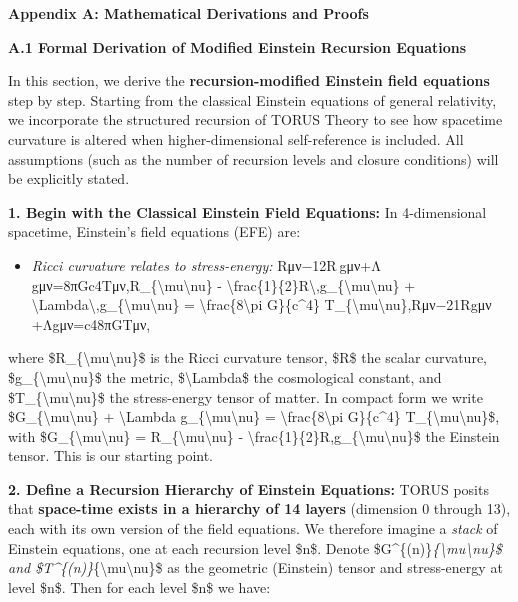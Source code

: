 \documentclass[]{article}
\date{}
\begin{document}
\textbf{Appendix A: Mathematical Derivations and Proofs}

\textbf{A.1 Formal Derivation of Modified Einstein Recursion Equations}

In this section, we derive the \textbf{recursion-modified Einstein field
equations} step by step. Starting from the classical Einstein equations
of general relativity, we incorporate the structured recursion of TORUS
Theory to see how spacetime curvature is altered when higher-dimensional
self-reference is included. All assumptions (such as the number of
recursion levels and closure conditions) will be explicitly stated.

\textbf{1. Begin with the Classical Einstein Field Equations:} In
4-dimensional spacetime, Einstein's field equations (EFE) are:

\begin{itemize}
\item
  \emph{Ricci curvature relates to stress-energy:}
  Rμν−12R gμν+Λ gμν=8πGc4Tμν,R\_\{\textbackslash{}mu\textbackslash{}nu\}
  -
  \textbackslash{}frac\{1\}\{2\}R\textbackslash{},g\_\{\textbackslash{}mu\textbackslash{}nu\}
  +
  \textbackslash{}Lambda\textbackslash{},g\_\{\textbackslash{}mu\textbackslash{}nu\}
  = \textbackslash{}frac\{8\textbackslash{}pi G\}\{c\^{}4\}
  T\_\{\textbackslash{}mu\textbackslash{}nu\},Rμν​−21​Rgμν​+Λgμν​=c48πG​Tμν​,
\end{itemize}

where \$R\_\{\textbackslash{}mu\textbackslash{}nu\}\$ is the Ricci
curvature tensor, \$R\$ the scalar curvature,
\$g\_\{\textbackslash{}mu\textbackslash{}nu\}\$ the metric,
\$\textbackslash{}Lambda\$ the cosmological constant, and
\$T\_\{\textbackslash{}mu\textbackslash{}nu\}\$ the stress-energy tensor
of matter. In compact form we write
\$G\_\{\textbackslash{}mu\textbackslash{}nu\} + \textbackslash{}Lambda
g\_\{\textbackslash{}mu\textbackslash{}nu\} =
\textbackslash{}frac\{8\textbackslash{}pi G\}\{c\^{}4\}
T\_\{\textbackslash{}mu\textbackslash{}nu\}\$, with
\$G\_\{\textbackslash{}mu\textbackslash{}nu\} =
R\_\{\textbackslash{}mu\textbackslash{}nu\} -
\textbackslash{}frac\{1\}\{2\}R,g\_\{\textbackslash{}mu\textbackslash{}nu\}\$
the Einstein tensor. This is our starting point​.

\textbf{2. Define a Recursion Hierarchy of Einstein Equations:} TORUS
posits that \textbf{space-time exists in a hierarchy of 14 layers}
(dimension 0 through 13), each with its own version of the field
equations​. We therefore imagine a \emph{stack} of Einstein equations,
one at each recursion level \$n\$. Denote
\$G\^{}\{(n)\}\emph{\{\textbackslash{}mu\textbackslash{}nu\}\$ and
\$T\^{}\{(n)\}}\{\textbackslash{}mu\textbackslash{}nu\}\$ as the
geometric (Einstein) tensor and stress-energy at level \$n\$. Then for
each level \$n\$ we have:
\end{document}
